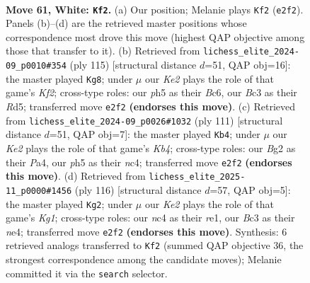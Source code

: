 \documentclass[11pt]{article}
\begin{document}
\clearpage

\begin{figure}[p]\centering
\begin{subfigure}{0.46\textwidth}\centering
\resizebox{\linewidth}{!}{%
\newchessgame
\chessboard[
  setfen={3r4/4b3/p2p2kp/4p2p/2n1P3/2B2P2/4K1B1/7R w - - 0 61},
  showmover=false,
  pgfstyle=straightmove, color=movearrow, markmove={e2-f2}
]}
\caption{}
\end{subfigure}\hfill
\begin{subfigure}{0.46\textwidth}\centering
\resizebox{\linewidth}{!}{%
\newchessgame
\chessboard[
  setfen={8/1p3kp1/2b5/2Pr2Bp/p6P/P4PK1/1P4P1/2R5 b - - 51 58},
  showmover=false,
  pgfstyle=straightmove, color=movearrow, markmove={f7-g8}
]}
\caption{}
\end{subfigure}
\\[4pt]
\begin{subfigure}{0.46\textwidth}\centering
\resizebox{\linewidth}{!}{%
\newchessgame
\chessboard[
  setfen={3r3b/5p2/6p1/1kp3P1/p1N1KP2/4P3/1PR5/8 b - - 32 56},
  showmover=false,
  pgfstyle=straightmove, color=movearrow, markmove={b5-b4}
]}
\caption{}
\end{subfigure}\hfill
\begin{subfigure}{0.46\textwidth}\centering
\resizebox{\linewidth}{!}{%
\newchessgame
\chessboard[
  setfen={4N3/3Bb3/R2pP1k1/1p4p1/1P2np2/5r1P/8/4r1K1 w - - 5 59},
  showmover=false,
  pgfstyle=straightmove, color=movearrow, markmove={g1-g2}
]}
\caption{}
\end{subfigure}
\caption{\textbf{Move 61, White: \texttt{Kf2}.} (a) Our position; Melanie plays \texttt{Kf2} (\texttt{e2f2}). Panels (b)--(d) are the retrieved master positions whose correspondence most drove this move (highest QAP objective among those that transfer to it). (b) Retrieved from \texttt{lichess\_elite\_2024-09\_p0010\#354} (ply 115) [structural distance $d$=51, QAP obj=16]: the master played \texttt{Kg8}; under $\mu$ our \emph{Ke2} plays the role of that game's \emph{Kf2}; cross-type roles: our \emph{p}h5 as their \emph{B}c6, our \emph{B}c3 as their \emph{R}d5; transferred move \texttt{e2f2} \textbf{(endorses this move)}. (c) Retrieved from \texttt{lichess\_elite\_2024-09\_p0026\#1032} (ply 111) [structural distance $d$=51, QAP obj=7]: the master played \texttt{Kb4}; under $\mu$ our \emph{Ke2} plays the role of that game's \emph{Kb4}; cross-type roles: our \emph{B}g2 as their \emph{P}a4, our \emph{p}h5 as their \emph{n}c4; transferred move \texttt{e2f2} \textbf{(endorses this move)}. (d) Retrieved from \texttt{lichess\_elite\_2025-11\_p0000\#1456} (ply 116) [structural distance $d$=57, QAP obj=5]: the master played \texttt{Kg2}; under $\mu$ our \emph{Ke2} plays the role of that game's \emph{Kg1}; cross-type roles: our \emph{n}c4 as their \emph{r}e1, our \emph{B}c3 as their \emph{n}e4; transferred move \texttt{e2f2} \textbf{(endorses this move)}. Synthesis: 6 retrieved analogs transferred to \texttt{Kf2} (summed QAP objective 36, the strongest correspondence among the candidate moves); Melanie committed it via the \texttt{search} selector.}
\label{fig:thought-m120}
\end{figure}
\end{document}
